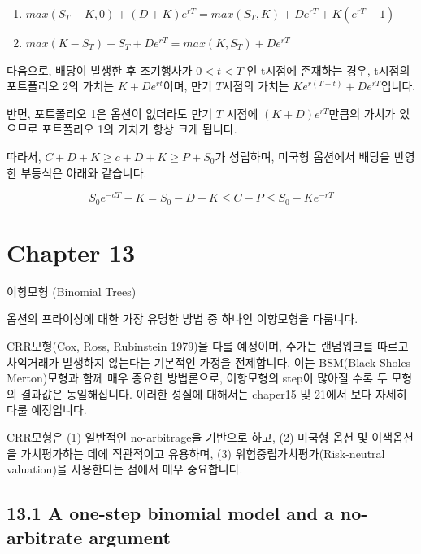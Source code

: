 \documentclass[
  letterpaper,
  DIV=11,
  numbers=noendperiod]{scrreprt}
\providecommand{\tightlist}{%
  \setlength{\itemsep}{0pt}\setlength{\parskip}{0pt}}\usepackage{longtable,booktabs,array}
\begin{document}
\begin{enumerate}
\def\labelenumi{\arabic{enumi}.}
\tightlist
\item
  \(max(S_T-K,0)+(D+K)e^{rT}=max(S_T,K)+De^{rT}+K(e^{rT}-1)\)
\item
  \(max(K-S_T)+S_T+De^{rT}=max(K,S_T)+De^{rT}\)
\end{enumerate}

다음으로, 배당이 발생한 후 조기행사가 \(0<t<T\) 인 t시점에 존재하는
경우, t시점의 포트폴리오 2의 가치는 \(K+De^{rt}\)이며, 만기 \(T\)시점의
가치는 \(Ke^{r(T-t)}+De^{rT}\)입니다.

반면, 포트폴리오 1은 옵션이 없더라도 만기 \(T\) 시점에
\((K+D)e^{rT}\)만큼의 가치가 있으므로 포트폴리오 1의 가치가 항상 크게
됩니다.

따라서, \(C+D+K\geq c+D+K\geq P+S_0\)가 성립하며, 미국형 옵션에서 배당을
반영한 부등식은 아래와 같습니다.

\[S_0e^{-dT}-K=S_0-D-K\leq C-P \leq S_0-Ke^{-rT}\]


\chapter*{Chapter 13}\label{chapter-13}


이항모형 (Binomial Trees)

옵션의 프라이싱에 대한 가장 유명한 방법 중 하나인 이항모형을 다룹니다.

CRR모형(Cox, Ross, Rubinstein 1979)을 다룰 예정이며, 주가는 랜덤워크를
따르고 차익거래가 발생하지 않는다는 기본적인 가정을 전제합니다. 이는
BSM(Black-Sholes-Merton)모형과 함께 매우 중요한 방법론으로, 이항모형의
step이 많아질 수록 두 모형의 결과값은 동일해집니다. 이러한 성질에
대해서는 chaper15 및 21에서 보다 자세히 다룰 예정입니다.

CRR모형은 (1) 일반적인 no-arbitrage을 기반으로 하고, (2) 미국형 옵션 및
이색옵션을 가치평가하는 데에 직관적이고 유용하며, (3)
위험중립가치평가(Risk-neutral valuation)을 사용한다는 점에서 매우
중요합니다.

\section*{13.1 A one-step binomial model and a no-arbitrate
argument}\label{a-one-step-binomial-model-and-a-no-arbitrate-argument}
\end{document}
